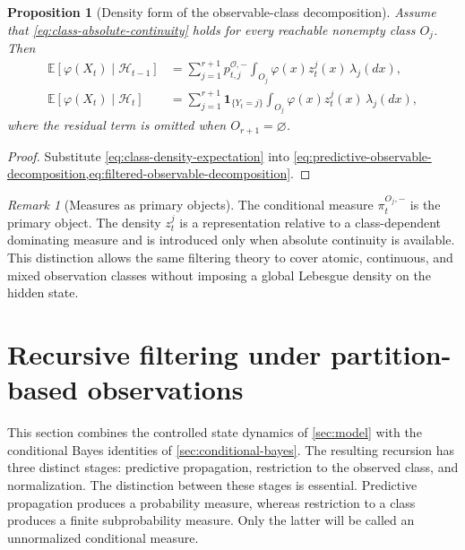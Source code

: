 \documentclass[10pt,twocolumn]{article}
\newtheorem{proposition}{Proposition}
\theoremstyle{remark}
\newtheorem{remark}{Remark}
\newcommand{\E}{\mathbb{E}}
\newcommand{\Hh}{\mathcal{H}}
\newcommand{\Oo}{\mathcal{O}}
\newcommand{\one}{\mathbf{1}}
\begin{document}
\begin{proposition}[Density form of the observable-class decomposition]
	\label{prop:density-observable-decomposition}
	Assume that \cref{eq:class-absolute-continuity} holds for every reachable nonempty class $O_j$. Then
	\begin{align}
		\E[\varphi(X_t)\mid\Hh_{t-1}]
		&=
		\sum_{j=1}^{r+1}p_{t,j}^{\Oo,-}
		\int_{O_j}\varphi(x)z_t^j(x)\,\lambda_j(dx),
		\label{eq:predictive-density-decomposition}
		\\
		\E[\varphi(X_t)\mid\Hh_t]
		&=
		\sum_{j=1}^{r+1}\one_{\{Y_t=j\}}
		\int_{O_j}\varphi(x)z_t^j(x)\,\lambda_j(dx),
		\label{eq:filtered-density-decomposition}
	\end{align}
	where the residual term is omitted when $O_{r+1}=\varnothing$.
\end{proposition}

\begin{proof}
	Substitute \cref{eq:class-density-expectation} into \cref{eq:predictive-observable-decomposition,eq:filtered-observable-decomposition}.
\end{proof}

\begin{remark}[Measures as primary objects]
	\label{rem:measures-primary}
	The conditional measure $\pi_t^{O_j,-}$ is the primary object. The density $z_t^j$ is a representation relative to a class-dependent dominating measure and is introduced only when absolute continuity is available. This distinction allows the same filtering theory to cover atomic, continuous, and mixed observation classes without imposing a global Lebesgue density on the hidden state.
\end{remark}

%
%

\section{Recursive filtering under partition-based observations}
\label{sec:recursive-filtering}

This section combines the controlled state dynamics of \cref{sec:model} with the conditional Bayes identities of \cref{sec:conditional-bayes}. The resulting recursion has three distinct stages: predictive propagation, restriction to the observed class, and normalization. The distinction between these stages is essential. Predictive propagation produces a probability measure, whereas restriction to a class produces a finite subprobability measure. Only the latter will be called an unnormalized conditional measure.
\end{document}
